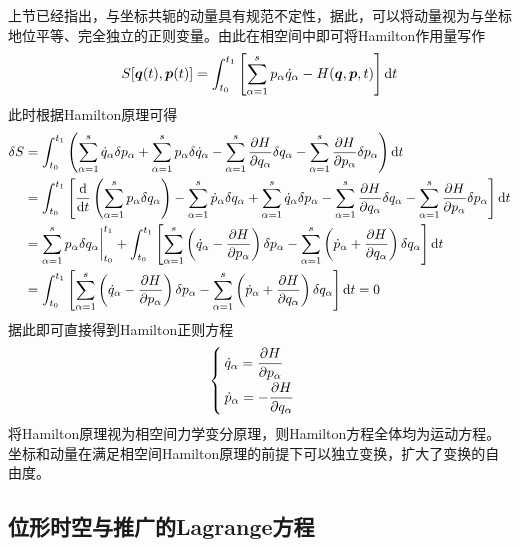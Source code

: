 上节已经指出，与坐标共轭的动量具有规范不定性，据此，可以将动量视为与坐标地位平等、完全独立的正则变量。由此在相空间中即可将Hamilton作用量写作
\begin{equation}
	S[\boldsymbol{q}(t),\boldsymbol{p}(t)] = \int_{t_0}^{t_1} \left[\sum_{\alpha=1}^s p_\alpha \dot{q}_\alpha - H(\boldsymbol{q},\boldsymbol{p},t)\right] \mathrm{d} t
\end{equation}
此时根据Hamilton原理可得
\begin{align}
	\delta S & = \int_{t_0}^{t_1} \left(\sum_{\alpha=1}^s \dot{q}_\alpha \delta p_\alpha + \sum_{\alpha=1}^s p_\alpha \delta \dot{q}_\alpha - \sum_{\alpha=1}^s \frac{\partial H}{\partial q_\alpha} \delta q_\alpha - \sum_{\alpha=1}^s \frac{\partial H}{\partial p_\alpha} \delta p_\alpha \right) \mathrm{d} t \nonumber \\
	& = \int_{t_0}^{t_1} \left[\frac{\mathrm{d}}{\mathrm{d} t} \left(\sum_{\alpha=1}^s p_\alpha \delta q_\alpha\right) - \sum_{\alpha=1}^s \dot{p}_\alpha \delta q_\alpha + \sum_{\alpha=1}^s \dot{q}_\alpha \delta p_\alpha - \sum_{\alpha=1}^s \frac{\partial H}{\partial q_\alpha} \delta q_\alpha - \sum_{\alpha=1}^s \frac{\partial H}{\partial p_\alpha} \delta p_\alpha \right] \mathrm{d} t \nonumber \\
	& = \sum_{\alpha=1}^s p_\alpha \delta q_\alpha \bigg|_{t_0}^{t_1} + \int_{t_0}^{t_1} \left[\sum_{\alpha=1}^s \left(\dot{q}_\alpha - \frac{\partial H}{\partial p_\alpha}\right) \delta p_\alpha - \sum_{\alpha=1}^s \left(\dot{p}_\alpha + \frac{\partial H}{\partial q_\alpha}\right) \delta q_\alpha \right] \mathrm{d} t \nonumber \\
	& = \int_{t_0}^{t_1} \left[\sum_{\alpha=1}^s \left(\dot{q}_\alpha - \frac{\partial H}{\partial p_\alpha}\right) \delta p_\alpha - \sum_{\alpha=1}^s \left(\dot{p}_\alpha + \frac{\partial H}{\partial q_\alpha}\right) \delta q_\alpha \right] \mathrm{d} t = 0
\end{align}
据此即可直接得到Hamilton正则方程
\begin{equation}
	\begin{cases}
		\dot{q}_\alpha = \dfrac{\partial H}{\partial p_\alpha} \\[1.5ex]
		\dot{p}_\alpha = -\dfrac{\partial H}{\partial q_\alpha}
	\end{cases}
\end{equation}
将Hamilton原理视为相空间力学变分原理，则Hamilton方程全体均为运动方程。坐标和动量在满足相空间Hamilton原理的前提下可以独立变换，扩大了变换的自由度。

\subsection{位形时空与推广的Lagrange方程}

